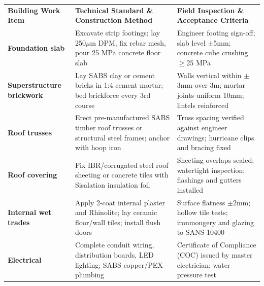 \documentclass[a4paper,11pt]{article}
\begin{document}
{\fontsize{7.7pt}{9.8pt}\selectfont
\renewcommand{\arraystretch}{1.23}
\noindent
\begin{tabularx}{\textwidth}{@{}p{3.3cm} p{6.6cm} X@{}}
\rowcolor{mhnavy}
{\color{white}\bfseries Building Work Item} & {\color{white}\bfseries Technical Standard \& Construction Method} & {\color{white}\bfseries Field Inspection \& Acceptance Criteria} \\
\rowcolor{mhbluelight}
\bfseries Foundation slab & Excavate strip footings; lay 250$\mu$m DPM, fix rebar mesh, pour 25 MPa concrete floor slab & Engineer footing sign-off; slab level $\pm$5mm; concrete cube crushing $\ge$25 MPa \\
\bfseries Superstructure brickwork & Lay SABS clay or cement bricks in 1:4 cement mortar; bed brickforce every 3rd course & Walls vertical within $\pm$3mm over 3m; mortar joints uniform 10mm; lintels reinforced \\
\rowcolor{mhbluelight}
\bfseries Roof trusses & Erect pre-manufactured SABS timber roof trusses or structural steel frames; anchor with hoop iron & Truss spacing verified against engineer drawings; hurricane clips and bracing fixed \\
\bfseries Roof covering & Fix IBR/corrugated steel roof sheeting or concrete tiles with Sisalation insulation foil & Sheeting overlaps sealed; watertight inspection; flashings and gutters installed \\
\rowcolor{mhbluelight}
\bfseries Internal wet trades & Apply 2-coat internal plaster and Rhinolite; lay ceramic floor/wall tiles; install flush doors & Surface flatness $\pm$2mm; hollow tile tests; ironmongery and glazing to SANS 10400 \\
\bfseries Electrical & Complete conduit wiring, distribution boards, LED lighting; SABS copper/PEX plumbing & Certificate of Compliance (COC) issued by master electrician; water pressure test \\
\end{tabularx}
\renewcommand{\arraystretch}{1}
}

\vfill
\end{document}
